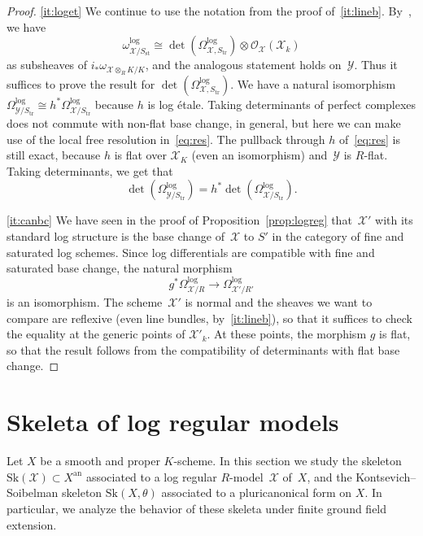 \documentclass[JEP,XML,SOM,Unicode,NoFloatCountersInSection]{cedram}
\let\mathcal\mathscr
\theoremstyle{definition}
\numberwithin{equation}{subsection}
\newcommand{\cX}{\ensuremath{\mathscr{X}}}
\newcommand{\cY}{\ensuremath{\mathscr{Y}}}
\newcommand{\an}{\mathrm{an}}
\newcommand{\Sk}{\mathrm{Sk}}
\newcommand{\st}{\mathrm{st}}
\newcommand{\tr}{\mathrm{tr}}
\let\form\theta
\begin{document}
\begin{proof}
\eqref{it:loget} We continue to use the notation from the proof of~\eqref{it:lineb}. By~\cite[5.3.4]{kato-saito}, we have
\[
\omega^{\log}_{\cX/S_{\st}}\cong \det(\Omega^{\log}_{\cX,S_{\tr}})\otimes \mathcal{O}_{\cX}(\cX_k)
\]
as subsheaves of
$i_\ast \omega_{\cX\otimes_R K/K}$, and the analogous statement holds on~$\cY$. Thus it suffices to prove the result for $\det(\Omega^{\log}_{\cX,S_{\tr}})$.
We have a natural isomorphism $\Omega^{\log}_{\cY/S_{\tr}}\cong h^{\ast}\Omega^{\log}_{\cX/S_{\tr}}$ because $h$ is log étale.
Taking determinants of perfect complexes does not commute with non-flat base change, in general, but here we can make use of the local free resolution in~\eqref{eq:res}.
The pullback through $h$ of~\eqref{eq:res} is still exact, because $h$ is flat over $\cX_K$ (even an isomorphism) and~$\cY$ is $R$\nobreakdash-flat.
Taking determinants, we get that
\[
\det(\Omega^{\log}_{\cY/S_{\tr}})=h^{\ast}\det(\Omega^{\log}_{\cX/S_{\tr}}).
\]

\eqref{it:canbc} We have seen in the proof of Proposition~\ref{prop:logreg} that~$\cX'$ with its standard log structure is the
base change of~$\cX$ to $S'$ in the category of fine and saturated log schemes. Since log differentials are compatible with fine and saturated base change, the natural morphism
\[
g^{\ast} \Omega^{\log}_{\cX/R}\to \Omega^{\log}_{\cX'/R'}
\]
is an isomorphism.
The scheme~$\cX'$ is normal and the sheaves we want to compare are reflexive (even line bundles, by~\eqref{it:lineb}), so that it suffices to check the equality at the generic points of $\cX'_k$. At these points, the morphism $g$ is flat, so that the result follows from the compatibility of determinants with flat base change.
\end{proof}

\section{Skeleta of log regular models}\label{sec:skeleta}
Let $X$ be a smooth and proper $K$\nobreakdash-scheme. In this section we study the skeleton $\Sk(\cX)\subset X^{\an}$ associated to a log regular $R$\nobreakdash-model~$\cX$ of~$X$,
and the Kontsevich--Soibelman skeleton $\Sk(X,\form)$ associated to a pluricanonical form on $X$. In particular, we analyze the behavior of these skeleta under finite ground field extension.
\end{document}

